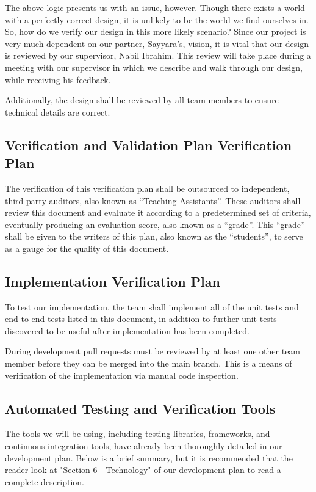 \documentclass[12pt, titlepage]{article}
\begin{document}
The above logic presents us with an issue, however. Though there exists a world with a perfectly correct design, it is unlikely to be the world we find ourselves in. So, how do we verify our design in this more likely scenario? Since our project is very much dependent on our partner, Sayyara's, vision, it is vital that our design is reviewed by our supervisor, Nabil Ibrahim. This review will take place during a meeting with our supervisor in which we describe and walk through our design, while receiving his feedback.

Additionally, the design shall be reviewed by all team members to ensure technical details are correct.

\subsection{Verification and Validation Plan Verification Plan}

The verification of this verification plan shall be outsourced to independent, third-party auditors, also known as ``Teaching Assistants''. These auditors shall review this document and evaluate it according to a predetermined set of criteria, eventually producing an evaluation score, also known as a ``grade''. This ``grade'' shall be given to the writers of this plan, also known as the ``students'', to serve as a gauge for the quality of this document.

\subsection{Implementation Verification Plan}

To test our implementation, the team shall implement all of the unit tests and end-to-end tests listed in this document, in addition to further unit tests discovered to be useful after implementation has been completed.

During development pull requests must be reviewed by at least one other team member before they can be merged into the main branch. This is a means of verification of the implementation via manual code inspection.

\subsection{Automated Testing and Verification Tools}

The tools we will be using, including testing libraries, frameworks, and continuous integration tools, have already been thoroughly detailed in our development plan. Below is a brief summary, but it is recommended that the reader look at "Section 6 - Technology" of our development plan to read a complete description.
\end{document}
